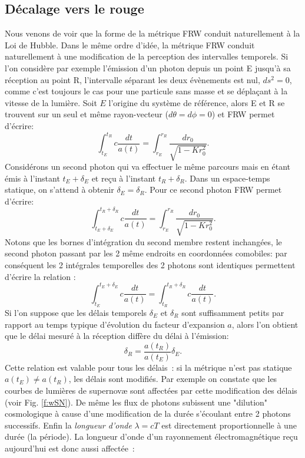 \subsection{Décalage vers le rouge}
Nous venons de voir que la forme de la métrique FRW conduit naturellement à la Loi de Hubble. Dans le même ordre d'idée, la métrique FRW conduit naturellement à une modification de la perception des intervalles temporels. Si l'on considère par exemple l'émission d'un photon depuis un point E jusqu'à sa réception au point R, l'intervalle séparant les deux évènements est nul, $ds^2=0$, comme c'est toujours le cas pour une particule sans masse et se déplaçant à la vitesse de la lumière. Soit $E$ l'origine du système de référence, alors E et R se trouvent sur un seul et même rayon-vecteur ($d\theta=d\phi=0$) et FRW permet d'écrire:
\begin{equation}
\int_{t_E}^{t_R}c\frac{dt}{a(t)}=\int_{r_E}^{r_R}\frac{ dr_0}{\sqrt{1-Kr_0^2}}.
\end{equation}
Considérons un second photon qui va effectuer le même parcours mais en étant émis à l'instant $t_E+\delta_E$ et reçu à l'instant $t_R+\delta_R$. Dans un espace-temps statique, on s'attend à obtenir $\delta_E=\delta_R$. Pour ce second photon FRW permet d'écrire:
\begin{equation}
\int_{t_E+\delta_E}^{t_R+\delta_R}c\frac{dt}{a(t)}=\int_{r_E}^{r_R}\frac{ dr_0}{\sqrt{1-Kr_0^2}}.
\end{equation}
Notons que les bornes d'intégration du second membre restent inchangées, le second photon passant par les 2 même endroits en coordonnées comobiles: par conséquent les 2 intégrales temporelles des 2 photons sont identiques permettent d'écrire la relation :
\begin{equation}
\int_{t_E}^{t_E+\delta_E}c\frac{dt}{a(t)}=\int_{t_R}^{t_R+\delta_R}c\frac{dt}{a(t)}.
\end{equation}
Si l'on suppose que les délais temporels $\delta_E$ et $\delta_R$ sont suffisamment petits par rapport au temps typique d'évolution du facteur d'expansion $a$, alors l'on obtient que le délai mesuré à la réception diffère du délai à l'émission:
\begin{equation}
\delta_R=\frac{a(t_R)}{a(t_E)} \delta_E.
\end{equation}
Cette relation est valable pour tous les délais~: si la métrique n'est pas statique $a(t_E)\neq a(t_R)$, les délais sont modifiés. Par exemple on constate que les courbes de lumières de supernovæ sont affectées par cette modification des délais (voir Fig. \ref{f:wSN}). De même les flux de photons subissent une "dilution" cosmologique à cause d'une modification de la durée s'écoulant entre 2 photons successifs. Enfin la \textit{longueur d'onde} $\lambda=cT$ est directement proportionnelle à une durée (la période). La longueur d'onde d'un rayonnement électromagnétique reçu aujourd'hui est donc aussi affectée~:
